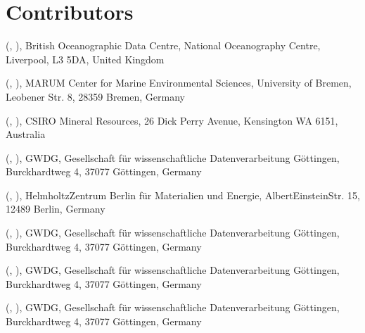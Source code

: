 \documentclass[a4paper,10pt,english]{sphinxmanual}
\begin{document}
\section{Contributors}
\label{\detokenize{white-paper/index:contributors}}
\sphinxAtStartPar
{} (, ),
British Oceanographic Data Centre, National Oceanography Centre,
Liverpool, L3 5DA, United Kingdom

\sphinxAtStartPar
{} (, ),
MARUM \sphinxhyphen{} Center for Marine Environmental Sciences, University of Bremen,
Leobener Str. 8, 28359 Bremen, Germany

\sphinxAtStartPar
{} (, ),
CSIRO Mineral Resources, 26 Dick Perry Avenue, Kensington WA 6151, Australia

\sphinxAtStartPar
{} (, ),
GWDG, Gesellschaft für wissenschaftliche Datenverarbeitung Göttingen,
Burckhardtweg 4, 37077 Göttingen, Germany

\sphinxAtStartPar
{} (, ),
Helmholtz\sphinxhyphen{}Zentrum Berlin für Materialien und Energie,
Albert\sphinxhyphen{}Einstein\sphinxhyphen{}Str. 15, 12489 Berlin, Germany

\sphinxAtStartPar
{} (, ),
GWDG, Gesellschaft für wissenschaftliche Datenverarbeitung Göttingen,
Burckhardtweg 4, 37077 Göttingen, Germany

\sphinxAtStartPar
{} (, ),
GWDG, Gesellschaft für wissenschaftliche Datenverarbeitung Göttingen,
Burckhardtweg 4, 37077 Göttingen, Germany

\sphinxAtStartPar
{} (, ),
GWDG, Gesellschaft für wissenschaftliche Datenverarbeitung Göttingen,
Burckhardtweg 4, 37077 Göttingen, Germany
\end{document}
